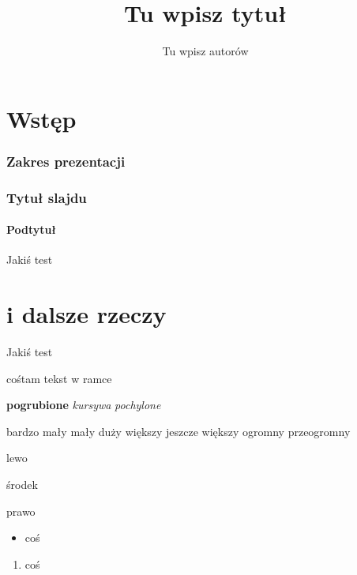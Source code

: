 \documentclass[a4paper]{beamer}
\title{Tu wpisz tytuł}
\author{Tu wpisz autorów}
\date{}
\begin{document}
\section{Wstęp}
\begin{frame}
\titlepage
\end{frame}
\begin{frame}
\frametitle{Zakres prezentacji}
\tableofcontents
\end{frame}
\begin{frame}
\frametitle{Tytuł slajdu}
\framesubtitle{Podtytuł}
Jakiś test
\end{frame}
\section{i dalsze rzeczy}
\begin{frame}
\begin{center}
Jakiś test
\end{center}
\end{frame}
\begin{frame}
\begin{block}{cośtam}
tekst w ramce
\end{block}
\end{frame}
\begin{frame}
\textbf{pogrubione} \textit{kursywa} \textsl{pochylone}

{\tiny bardzo mały} {\small mały} {\large duży} {\Large większy} {\LARGE jeszcze większy} {\huge ogromny} {\Huge przeogromny}

\begin{flushleft}
lewo
\end{flushleft}
\begin{center}
środek
\end{center}
\begin{flushright}
prawo
\end{flushright}
\begin{itemize}
\item coś
\end{itemize}
\begin{enumerate}
\item coś
\end{enumerate}
\end{frame}
\end{document}

